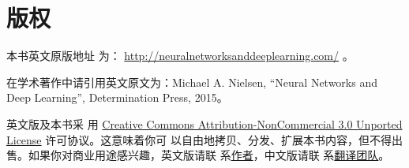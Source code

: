 
\chapter{版权}

本书英文原版地址
为：
\href{http://neuralnetworksanddeeplearning.com/}{http://neuralnetworksanddeeplearning.com/}
。

在学术著作中请引用英文原文为：Michael A. Nielsen, ``Neural Networks and Deep
Learning'', Determination Press, 2015。

英文版及本书采
用 \href{http://creativecommons.org/licenses/by-nc/3.0/deed.en_GB}{Creative
  Commons Attribution-NonCommercial 3.0 Unported License} 许可协议。这意味着你可
以自由地拷贝、分发、扩展本书内容，但不得出售。如果你对商业用途感兴趣，英文版请联
系\href{mailto:mn@michaelnielsen.org}{作者}，中文版请联
系\hyperref[ch:TranslationTeam]{翻译团队}。
